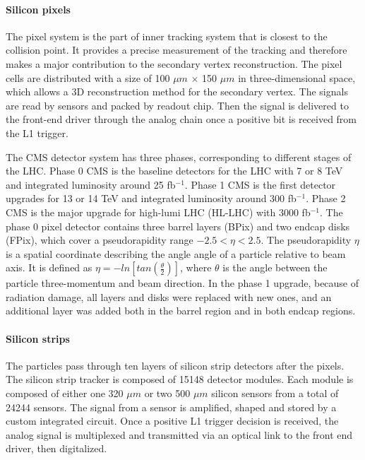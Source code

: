 \paragraph{Silicon pixels}
The pixel system is the part of inner tracking system that is closest to the collision point. It provides a precise measurement of the tracking and therefore makes a major contribution to the secondary vertex reconstruction. The pixel cells are distributed with a size of 100 $\mu m$ $\times$ 150 $\mu m$ in three-dimensional space, which allows a 3D reconstruction method for the secondary vertex. The signals are read by sensors and packed by readout chip. Then the signal is delivered to the front-end driver through the analog chain once a positive bit is received from the L1 trigger.

The CMS detector system has three phases, corresponding to different stages of the LHC. Phase 0 CMS is the baseline detectors for the LHC with 7 or 8 TeV and integrated luminosity around 25 fb$^{-1}$. Phase 1 CMS is the first detector upgrades for 13 or 14 TeV and integrated luminosity around 300 fb$^{-1}$. Phase 2 CMS is the major upgrade for high-lumi LHC (HL-LHC) with 3000 fb$^{-1}$. The phase 0 pixel detector contains three barrel layers (BPix) and two endcap disks (FPix), which cover a pseudorapidity range $-2.5<\eta<2.5$. The pseudorapidity $\eta$ is a spatial coordinate describing the angle angle of a particle relative to beam axis. It is defined as $\eta = -ln[tan(\frac{\theta}{2})]$, where $\theta$ is the angle between the particle three-momentum and beam direction. In the phase 1 upgrade\cite{Klein:2140071}, because of radiation damage, all layers and disks were replaced with new ones, and an additional layer was added both in the barrel region and in both endcap regions.


\paragraph{Silicon strips}

The particles pass through ten layers of silicon strip detectors after the pixels. The silicon strip tracker is composed of 15148 detector modules. Each module is composed of either one 320 $\mu m$ or two 500 $\mu m$ silicon sensors from a total of 24244 sensors. The signal from a sensor is amplified, shaped and stored by a custom integrated circuit. Once a positive L1 trigger decision is received, the analog signal is multiplexed and transmitted via an optical link to the front end driver, then digitalized. 

